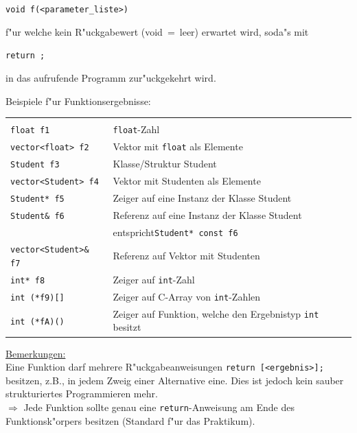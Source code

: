 \verb|void f(<parameter_liste>)|

f"ur welche kein R"uckgabewert (void~=~leer) erwartet wird, soda"s mit

\verb|return ;|

in das aufrufende Programm zur"uckgekehrt wird.

\begin{samepage}
Beispiele f"ur Funktionsergebnisse:
\\
\begin{tabular}{l@{\qquad}p{}}
 \mbox{}\\
 \verb|float f1| 	    & \texttt{float}-Zahl \\[0.5ex]
 \verb|vector<float> f2| 	    & Vektor mit \texttt{float} als Elemente \\[0.5ex]
 \verb|Student f3| 	& Klasse/Struktur Student \\[0.5ex]
 \verb|vector<Student> f4| 	& Vektor mit Studenten als Elemente \\[0.5ex]
 \verb|Student* f5| 	& Zeiger auf eine Instanz der Klasse Student \\[0.5ex]
 \verb|Student& f6| 	& Referenz auf eine Instanz der Klasse Student  
  \\ & 
    \qquad entspricht\qquad \verb|Student* const f6|\\[0.5ex]
 \verb|vector<Student>& f7| 	& Referenz auf Vektor mit Studenten \\[0.5ex]
 \verb|int* f8| 	    & Zeiger auf \texttt{int}-Zahl \\[0.5ex]
 \verb|int (*f9)[]| 	& Zeiger auf C-Array von  \texttt{int}-Zahlen \\[0.5ex]
 \verb|int (*fA)()| 	& Zeiger auf Funktion, welche den Ergebnistyp \texttt{int} besitzt
 \label{fkt:f6}
\end{tabular}
\end{samepage}

\underline{Bemerkungen:}
\\[0.5ex]
 Eine Funktion darf mehrere R"uckgabeanweisungen
 \verb|return [<ergebnis>];|
 besitzen, z.B., in jedem Zweig einer Alternative eine.
 Dies ist jedoch kein sauber strukturiertes Programmieren mehr.
 \\
 $\Longrightarrow$ Jede Funktion sollte genau eine \verb|return|-Anweisung
 am Ende des Funktionsk"orpers besitzen (Standard f"ur das Praktikum).

